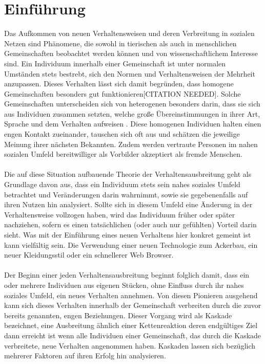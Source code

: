 \documentclass[12pt]{article}
\begin{document}
\section{Einführung}
Das Aufkommen von neuen Verhaltensweisen und deren Verbreitung in sozialen Netzen sind Phänomene, die sowohl in tierischen als auch in menschlichen Gemeinschaften beobachtet werden können und von wissenschaftlichem Interesse sind. Ein Individuum innerhalb einer Gemeinschaft ist unter normalen Umständen stets bestrebt, sich den Normen und Verhaltensweisen der Mehrheit anzupassen. Dieses Verhalten lässt sich damit begründen, dass homogene Gemeinschaften besonders gut funktionieren[CITATION NEEDED]. Solche Gemeinschaften unterscheiden sich von heterogenen besonders darin, dass sie sich aus Individuen zusammen setzten, welche große Übereinstimmungen in ihrer Art, Sprache und dem Verhalten aufweisen \cite{Rogers03}. Diese homogenen Individuen halten einen engen Kontakt zueinander, tauschen sich oft aus und schätzen die jeweilige Meinung ihrer nächsten Bekannten. Zudem werden vertraute Personen im nahen sozialen Umfeld bereitwilliger als Vorbilder akzeptiert als fremde Menschen.\\\\
Die auf diese Situation aufbauende Theorie der Verhaltensausbreitung geht als Grundlage davon aus, dass ein Individuum stets sein nahes soziales Umfeld betrachtet und Veränderungen darin wahrnimmt, sowie sie gegebenenfalls auf ihren Nutzen hin analysiert. Sollte sich in diesem Umfeld eine Änderung in der Verhaltensweise vollzogen haben, wird das Individuum früher oder später nachziehen, sofern es einen tatsächlichen (oder auch nur gefühlten) Vorteil darin sieht. Was mit der Einführung eines neuen Verhaltens hier konkret gemeint ist kann vielfältig sein. Die Verwendung einer neuen Technologie zum Ackerbau, ein neuer Kleidungsstil oder ein schnellerer Web Browser.\\\\
Der Beginn einer jeden Verhaltensausbreitung beginnt folglich damit, dass ein oder mehrere Individuen aus eigenen Stücken, ohne Einfluss durch ihr nahes soziales Umfeld, ein neues Verhalten annehmen. Von diesen Pionieren ausgehend kann sich dieses Verhalten innerhalb der Gemeinschaft verbreiten durch die zuvor bereits genannten, engen Beziehungen. Dieser Vorgang wird als Kaskade bezeichnet, eine Ausbreitung ähnlich einer Kettenreaktion deren endgültiges Ziel dann erreicht ist wenn alle Individuen einer Gemeinschaft, das durch die Kaskade verbreitete, neue Verhalten angenommen haben.
Kaskaden lassen sich bezüglich mehrerer Faktoren auf ihren Erfolg hin analysieren.
\end{document}
